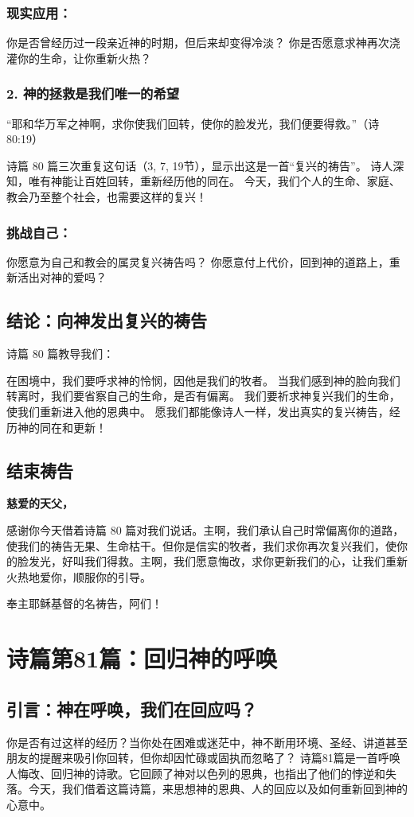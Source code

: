 \documentclass[a4paper, 12pt]{article}
\begin{document}
\subsubsection*{现实应用：}
你是否曾经历过一段亲近神的时期，但后来却变得冷淡？
你是否愿意求神再次浇灌你的生命，让你重新火热？
\subsubsection*{2. 神的拯救是我们唯一的希望}
“耶和华万军之神啊，求你使我们回转，使你的脸发光，我们便要得救。”（诗 80:19）

诗篇 80 篇三次重复这句话（3, 7, 19节），显示出这是一首“复兴的祷告”。
诗人深知，唯有神能让百姓回转，重新经历他的同在。
今天，我们个人的生命、家庭、教会乃至整个社会，也需要这样的复兴！
\subsubsection*{挑战自己：}

你愿意为自己和教会的属灵复兴祷告吗？
你愿意付上代价，回到神的道路上，重新活出对神的爱吗？
\subsection*{结论：向神发出复兴的祷告}
诗篇 80 篇教导我们：

在困境中，我们要呼求神的怜悯，因他是我们的牧者。
当我们感到神的脸向我们转离时，我们要省察自己的生命，是否有偏离。
我们要祈求神复兴我们的生命，使我们重新进入他的恩典中。
愿我们都能像诗人一样，发出真实的复兴祷告，经历神的同在和更新！

\subsection*{结束祷告}
\textbf{慈爱的天父，}

感谢你今天借着诗篇 80 篇对我们说话。主啊，我们承认自己时常偏离你的道路，使我们的祷告无果、生命枯干。但你是信实的牧者，我们求你再次复兴我们，使你的脸发光，好叫我们得救。主啊，我们愿意悔改，求你更新我们的心，让我们重新火热地爱你，顺服你的引导。

奉主耶稣基督的名祷告，阿们！
\newpage
\section{诗篇第81篇：回归神的呼唤}
\subsection*{引言：神在呼唤，我们在回应吗？}
你是否有过这样的经历？当你处在困难或迷茫中，神不断用环境、圣经、讲道甚至朋友的提醒来吸引你回转，但你却因忙碌或固执而忽略了？
诗篇81篇是一首呼唤人悔改、回归神的诗歌。它回顾了神对以色列的恩典，也指出了他们的悖逆和失落。今天，我们借着这篇诗篇，来思想神的恩典、人的回应以及如何重新回到神的心意中。
\end{document}
